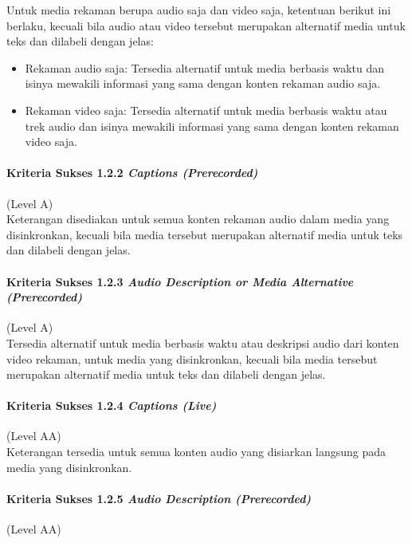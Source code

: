 Untuk media rekaman berupa audio saja dan video saja, ketentuan berikut ini berlaku, kecuali bila audio atau video tersebut merupakan alternatif media untuk teks dan dilabeli dengan jelas:
\begin{itemize}
	\item Rekaman audio saja: Tersedia alternatif untuk media berbasis waktu dan isinya mewakili informasi yang sama dengan konten rekaman audio saja.
	\item Rekaman video saja:  Tersedia alternatif untuk media berbasis waktu atau trek audio dan isinya mewakili informasi yang sama dengan konten rekaman video saja.
\end{itemize}

\paragraph{Kriteria Sukses 1.2.2 \textit{Captions (Prerecorded)}}
\label{sec:kriteria_sukses_1.2.2}
(Level A)\\

Keterangan disediakan untuk semua konten rekaman audio dalam media yang disinkronkan, kecuali bila media tersebut merupakan alternatif media untuk teks dan dilabeli dengan jelas.

\paragraph{Kriteria Sukses 1.2.3 \textit{Audio Description or Media Alternative (Prerecorded)}}
\label{sec:kriteria_sukses_1.2.3}
(Level A)\\

Tersedia alternatif untuk media berbasis waktu atau deskripsi audio dari konten video rekaman, untuk media yang disinkronkan, kecuali bila media tersebut merupakan alternatif media untuk teks dan dilabeli dengan jelas.

\paragraph{Kriteria Sukses 1.2.4 \textit{Captions (Live)}}
\label{sec:kriteria_sukses_1.2.4}
(Level AA)\\

Keterangan tersedia untuk semua konten audio yang disiarkan langsung pada media yang disinkronkan.

\paragraph{Kriteria Sukses 1.2.5 \textit{Audio Description (Prerecorded)}}
\label{sec:kriteria_sukses_1.2.5}
(Level AA)\\


